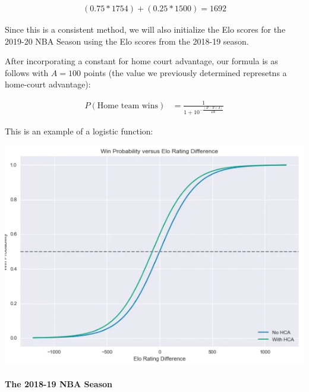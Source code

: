 \documentclass[]{article}
\let\oldparagraph\paragraph
\renewcommand{\paragraph}[1]{\oldparagraph{#1}\mbox{}}
\begin{document}
\[
\begin{aligned}
  (0.75 * 1754) + (0.25 * 1500) = 1692
\end{aligned}
\]

Since this is a consistent method, we will also initialize the Elo
scores for the 2019-20 NBA Season using the Elo scores from the 2018-19
season.

After incorporating a constant for home court advantage, our formula is
as follows with \(A=100\) points (the value we previously determined
represetns a home-court advantage):

\[
\begin{aligned}
  P(\textrm{Home team wins}) & = \frac{1}{1 + 10^{-\frac{(H-R+A)}{400}}}
\end{aligned}
\]

This is an example of a logistic function:

\begin{center}\includegraphics[width=.49\linewidth]{./logistic2} \end{center}

\hypertarget{the-2018-19-nba-season}{%
\paragraph{The 2018-19 NBA Season}\label{the-2018-19-nba-season}}
\end{document}
